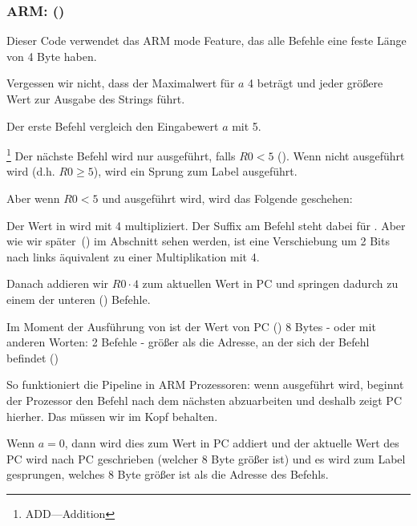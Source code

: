 \subsubsection{ARM: \OptimizingKeilVI (\ARMMode)}
\label{sec:SwitchARMLot}


Dieser Code verwendet das ARM mode Feature, das alle Befehle eine feste Länge von 4 Byte haben.

Vergessen wir nicht, dass der Maximalwert für $a$ 4 beträgt und jeder größere Wert zur Ausgabe des  Strings führt.

Der erste  Befehl vergleich den Eingabewert $a$ mit 5.

\footnote{ADD---Addition}
Der nächste  Befehl wird nur ausgeführt, falls $R0 < 5$ ().
Wenn  nicht ausgeführt wird (d.h. $R0\geq 5$), wird ein Sprung zum  Label ausgeführt.

Aber wenn $R0 < 5$ und  ausgeführt wird, wird das Folgende geschehen:

Der Wert in  wird mit 4 multipliziert.
Der Suffix  am Befehl steht dabei für .
Aber wie wir später~() im Abschnitt \q{\ShiftsSectionName} sehen werden, ist eine
Verschiebung um 2 Bits nach links äquivalent zu einer Multiplikation mit 4.

Danach addieren wir $R0\cdot 4$ zum aktuellen Wert in \ac{PC} und springen dadurch zu einem der unteren 
() Befehle.

Im Moment der Ausführung von ist der Wert von \ac{PC} () 8 Bytes - oder mit anderen Worten: 2
Befehle - größer als die Adresse, an der sich der  Befehl befindet ()

So funktioniert die Pipeline in ARM Prozessoren: wenn  ausgeführt wird, beginnt der Prozessor den Befehl
nach dem nächsten abzuarbeiten und deshalb zeigt \ac{PC} hierher. Das müssen wir im Kopf behalten.

Wenn $a=0$, dann wird dies zum Wert in \ac{PC} addiert und der aktuelle Wert des \ac{PC} wird nach \ac{PC} geschrieben
(welcher 8 Byte größer ist) und es wird zum Label  gesprungen, welches 8 Byte größer ist als die Adresse
des  Befehls.

